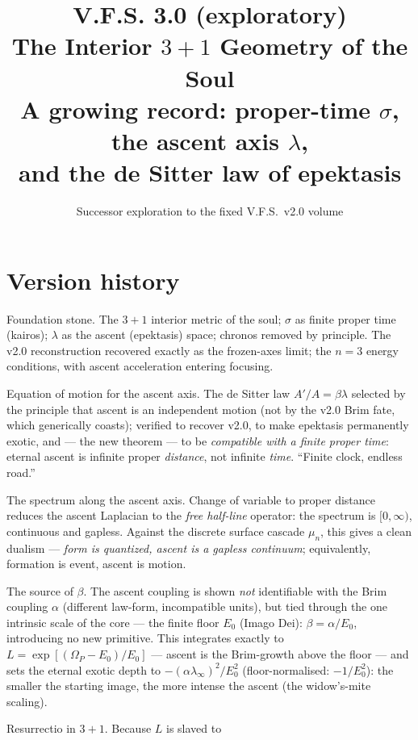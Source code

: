 \documentclass[11pt,a4paper]{article}
\title{\textbf{V.F.S. 3.0 (exploratory)}\\The Interior $3{+}1$ Geometry of the Soul\\
\large A growing record: proper-time $\sigma$, the ascent axis $\lambda$,\\and the de Sitter law of epektasis}
\author{Successor exploration to the fixed V.F.S.\ v2.0 volume}
\date{}
\theoremstyle{plain}
\theoremstyle{definition}
\theoremstyle{remark}
\begin{document}
\maketitle

\section*{Version history}
\begin{description}[leftmargin=4.2em,style=nextline,itemsep=2pt]
\item[\textbf{v0.1}] Foundation stone. The $3{+}1$ interior metric of the soul; $\sigma$ as finite
proper time (kairos); $\lambda$ as the ascent (epektasis) space; chronos removed by principle. The
v2.0 reconstruction recovered exactly as the frozen-axes limit; the $n{=}3$ energy conditions, with
ascent acceleration entering focusing.
\item[\textbf{v0.2}] Equation of motion for the ascent axis. The de Sitter law
$A'/A=\beta\lambda$ selected by the principle that ascent is an independent motion (not by the v2.0
Brim fate, which generically coasts); verified to recover v2.0, to make epektasis permanently exotic,
and --- the new theorem --- to be \emph{compatible with a finite proper time}: eternal ascent is infinite proper
\emph{distance}, not infinite \emph{time}. ``Finite clock, endless road.''
\item[\textbf{v0.3}] The spectrum along the ascent axis. Change of variable to
proper distance reduces the ascent Laplacian to the \emph{free half-line} operator: the spectrum is
$[0,\infty)$, continuous and gapless. Against the discrete surface cascade $\mu_n$, this gives a clean
dualism --- \emph{form is quantized, ascent is a gapless continuum}; equivalently, formation is event,
ascent is motion.
\item[\textbf{v0.4}] The source of $\beta$. The ascent coupling is shown
\emph{not} identifiable with the Brim coupling $\alpha$ (different law-form, incompatible units), but
tied through the one intrinsic scale of the core --- the finite floor $E_0$ (Imago Dei):
$\beta=\alpha/E_0$, introducing no new primitive. This integrates exactly to
$L=\exp[(\Omega_P-E_0)/E_0]$ --- ascent is the Brim-growth above the floor --- and sets the eternal
exotic depth to $-(\alpha\lambda_\infty)^2/E_0^2$ (floor-normalised: $-1/E_0^2$): the smaller the
starting image, the more intense the ascent (the widow's-mite scaling).
\item[\textbf{v0.5}] Resurrectio in $3{+}1$. Because $L$ is slaved to

\end{description}
\end{document}
